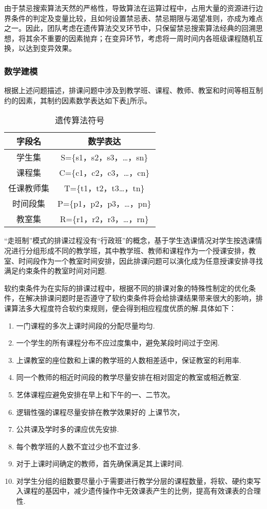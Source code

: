 \documentclass[bwprint]{cumcmthesis}
\begin{document}
由于禁忌搜索算法天然的严格性，导致算法在运算过程中，占用大量的资源进行边界条件的判定及变量比较，且如何设置禁忌表、禁忌期限与渴望准则，亦成为难点之一。因此，团队考虑在遗传算法交叉环节中，只保留禁忌搜索算法经典的回溯思想，将其余不重要的因素抛弃；在变异环节，考虑将一周时间内各班级课程随机互换，以达到变异效果。

\subsubsection{数学建模}
根据上述问题描述，排课问题中涉及到教学班、课程、教师、教室和时间等相互制约的因素，其制约因素数学表达如下表\ref{tab:Algorithms_char}所示。
\begin{longtable}{cc}
	\caption{\label{tab:Algorithms_char}遗传算法符号}\\
	\toprule
	字段名   & 数学表达 \\
	\midrule
	学生集   & S=\{s1，s2，s3，…，sn\} \\
	课程集   & C=\{c1，c2，c3，…，cn\} \\
	任课教师集 & T=\{t1，t2，t3…，tn\} \\
	时间段集  & P=\{p1，p2，p3，…，pn\} \\
	教室集   & R=\{r1，r2，r3，…，rn\} \\
	\bottomrule	
\end{longtable}%
“走班制”模式的排课过程没有“行政班”的概念，基于学生选课情况对学生按选课情况进行分组形成不同的教学班，其中教学班、教师和课程作为一个授课安排，教室、时间段作为一个教室时间安排，因此排课问题可以演化成为任意授课安排寻找满足约束条件的教室时间对问题.

软约束条件为在实际的排课过程中，根据不同的排课对象的特殊性制定的优化条件，在解决排课问题时是否遵守了软约束条件将会给排课结果带来很大的影响，排课算法多大程度符合软约束规则，便会得到相应程度优质的解.具体如下：
\begin{enumerate}
\item 一门课程的多次上课时间段的分配尽量均匀.
\item 一个学生的所有课程分布不应过度集中，避免某段时间过于空闲.
\item 上课教室的座位数和上课的教学班的人数相差适中，保证教室的利用率.
\item 同一个教师的相近时间段的教学尽量安排在相对固定的教室或相近教室.
\item 艺体课程应避免安排在早上和下午的一、二节次。
\item 逻辑性强的课程尽量安排在教学效果好的
上课节次，
\item 公共课及学时多的课应优先安排.
\item 每个教学班的人数不宜过少也不宜过多.
\item 对于上课时间确定的教师，首先确保满足其上课时间.
\item 对学生分组的组数要尽量小于需要进行教学分层的课程数量，将软、硬约束写入课程的基因中，减少遗传操作中无效课表产生的比例，提高有效课表的合理性.
\end{enumerate}
\end{document}
